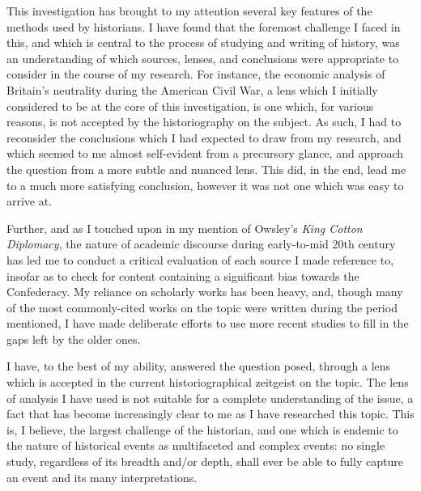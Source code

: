 
This investigation has brought to my attention several key features of the methods used by historians. I have found that the foremost challenge I faced in this,
and which is central to the process of studying and writing of history, was an understanding of which sources, lenses, and conclusions were appropriate to consider
in the course of my research. For instance, the economic analysis of Britain's neutrality during the American Civil War, a lens which I initially considered to
be at the core of this investigation, is one which, for various reasons, is not accepted by the historiography on the subject. As such, I had to reconsider the
conclusions which I had expected to draw from my research, and which seemed to me almost self-evident from a precursory glance, and approach the question from
a more subtle and nuanced lens. This did, in the end, lead me to a much more satisfying conclusion, however it was not one which was easy to arrive at.

Further, and as I touched upon in my mention of Owsley's \textit{King Cotton Diplomacy}, the nature of academic discourse during early-to-mid 20th
century has led me to conduct a critical evaluation of each source I made reference to, insofar as to check for content containing a significant bias towards
the Confederacy. My reliance on scholarly works has been heavy, and, though many of the most commonly-cited works on the topic were written during the period
mentioned, I have made deliberate efforts to use more recent studies to fill in the gaps left by the older ones. 

I have, to the best of my ability, answered the question posed, through a lens which is accepted in the current historiographical zeitgeist on the topic. The
lens of analysis I have used is not suitable for a complete understanding of the issue, a fact that has become increasingly clear to me as I have researched this
topic. This is, I believe, the largest challenge of the historian, and one which is endemic to the nature of historical events as multifaceted and complex
events: no single study, regardless of its breadth and/or depth, shall ever be able to fully capture an event and its many interpretations.